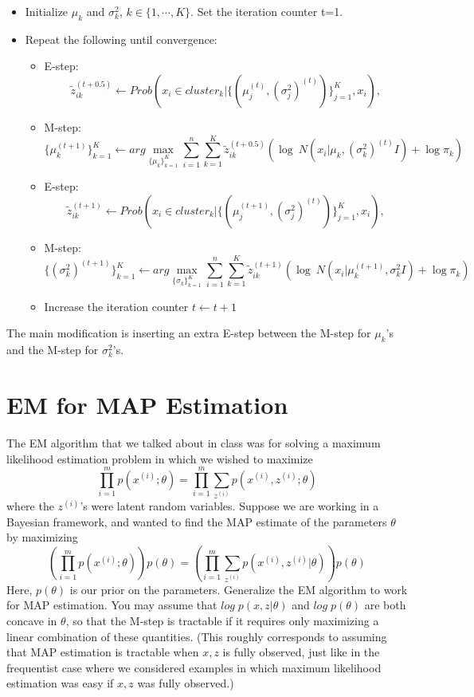 \documentclass{article}
\theoremstyle{definition}
\theoremstyle{definition}
\theoremstyle{remark}
\begin{document}
\begin{itemize}
  \item Initialize $\mu_k$ and $\sigma_k^2$, $k \in \{1,\cdots ,K\}$. Set the iteration counter t=1.
  \item Repeat the following until convergence:
  \begin{itemize}
    \item E-step:
    \[
    \tilde{z}_{ik}^{(t+0.5)} \leftarrow Prob\left(x_i\in cluster_k | \{(\mu_j^{(t)},(\sigma_j^2)^{(t)})\}_{j=1}^K,x_i\right),
    \]
    \item M-step:
    \[
    \{\mu_k^{(t+1)}\}_{k=1}^K \leftarrow arg\max_{\{\mu_k\}_{k=1}^K} \sum_{i=1}^n\sum_{k=1}^K \tilde{z}_{ik}^{(t+0.5)} \left(\log~N(x_i|\mu_k,(\sigma_k^2)^{(t)}I)+\log\pi_k\right)
    \]
    \item E-step:
    \[
    \tilde{z}_{ik}^{(t+1)} \leftarrow Prob\left(x_i \in cluster_k|\{(\mu_j^{(t+1)},(\sigma_j^2)^{(t)})\}_{j=1}^K,x_i\right),
    \]
    \item M-step:
    \[
    \{(\sigma_k^2)^{(t+1)}\}_{k=1}^K \leftarrow arg \max_{\{\sigma_k\}_{k=1}^K} \sum_{i=1}^n \sum_{k=1}^K \tilde{z}_{ik}^{(t+1)} \left(\log~N(x_i|\mu_k^{(t+1)},\sigma_k^2 I)+\log \pi_k \right)
    \]
    \item Increase the iteration counter $t\leftarrow t+1$
  \end{itemize}
\end{itemize}
The main modification is inserting an extra E-step between the M-step for $\mu_k$'s and the M-step for $\sigma_k^2$'s.


\section*{EM for MAP Estimation}
The EM algorithm that we talked about in class was for solving a maximum likelihood estimation problem in which we wished to maximize
\begin{equation}
  \prod_{i = 1}^mp(x^{(i)};\theta) = \prod_{i = 1}^m \sum_{z^{(i)}}p(x^{(i)},z^{(i)};\theta)
\end{equation}
where the $z^{(i)}$'s were latent random variables. Suppose we are working in a Bayesian framework, and wanted to find the MAP estimate of the parameters $\theta$ by maximizing
\begin{equation}
  (\prod_{i = 1}^mp(x^{(i)};\theta))p(\theta) = (\prod_{i = 1}^m \sum_{z^{(i)}}p(x^{(i)},z^{(i)}|\theta))p(\theta)
\end{equation}
Here, $p(\theta)$ is our prior on the parameters. Generalize the EM algorithm to work for MAP
estimation. You may assume that $log\;p(x,z|\theta)$ and $log\;p(\theta)$ are both concave in $\theta$, so
that the M-step is tractable if it requires only maximizing a linear combination of these
quantities. (This roughly corresponds to assuming that MAP estimation is tractable when
$x, z$ is fully observed, just like in the frequentist case where we considered examples in
which maximum likelihood estimation was easy if $x, z$ was fully observed.)
\end{document}
